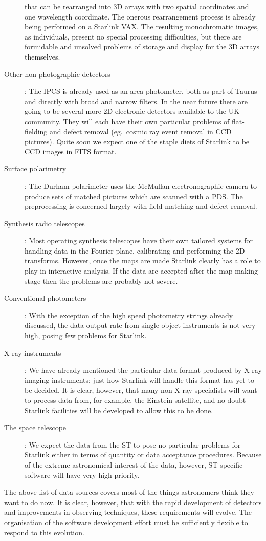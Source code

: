 \begin{description}
that can be rearranged into 3D arrays with two spatial coordinates and one
wavelength coordinate.
The onerous rearrangement process is already being performed on a Starlink VAX.
The resulting monochromatic images, as individuals, present no special
processing difficulties, but there are formidable and unsolved problems of
storage and display for the 3D arrays themselves.
\item [Other non-photographic detectors]: The IPCS is already used as an area
photometer, both as part of Taurus and directly with broad and narrow filters.
In the near future there are going to be several more 2D electronic detectors
available to the UK community.
They will each have their own particular problems of flat-fielding and defect
removal (eg.\ cosmic ray event removal in CCD pictures).
Quite soon we expect one of the staple diets of Starlink to be CCD images in
FITS format.
\item [Surface polarimetry]: The Durham polarimeter uses the McMullan
electronographic camera to produce sets of matched pictures which are scanned
with a PDS.
The preprocessing is concerned largely with field matching and defect removal.
\item [Synthesis radio telescopes]: Most operating synthesis telescopes have
their own tailored systems for handling data in the Fourier plane, calibrating
and performing the 2D transforms.
However, once the maps are made Starlink clearly has a role to play in
interactive analysis.
If the data are accepted after the map making stage then the problems are
probably not severe.
\item [Conventional photometers]: With the exception of the high speed
photometry strings already discussed, the data output rate from single-object
instruments is not very high, posing few problems for Starlink.
\item [X-ray instruments]: We have already mentioned the particular data format
produced by X-ray imaging instruments; just how Starlink will handle this format
has yet to be decided.
It is clear, however, that many non X-ray specialists will want to process data
from, for example, the Einstein satellite, and no doubt Starlink facilities will
be developed to allow this to be done.
\item [The space telescope]: We expect the data from the ST to pose no
particular problems for Starlink either in terms of quantity or data acceptance
procedures.
Because of the extreme astronomical interest of the data, however, ST-specific
software will have very high priority.
\end{description}
The above list of data sources covers most of the things astronomers think they
want to do now.
It is clear, however, that with the rapid development of detectors and
improvements in observing techniques, these requirements will evolve.
The organisation of the software development effort must be sufficiently
flexible to respond to this evolution.
